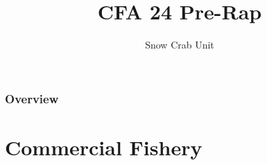 \documentclass{beamer}
\title[Science / Industry Pre-Rap]{CFA 24 Pre-Rap} %
\author{Snow Crab Unit} %
\institute[DFO] %
{
	Department of Fisheries and Oceans \\ %
	\medskip
	\textit{} %
}
\date{\the\year} %
\begin{document}
	
	\begin{frame}
		\titlepage %
	\end{frame}
	
	\begin{frame}
		\frametitle{Overview} %
		\tableofcontents%
	\end{frame}
	
	
	
	\section{Commercial Fishery}
	
\end{document}
